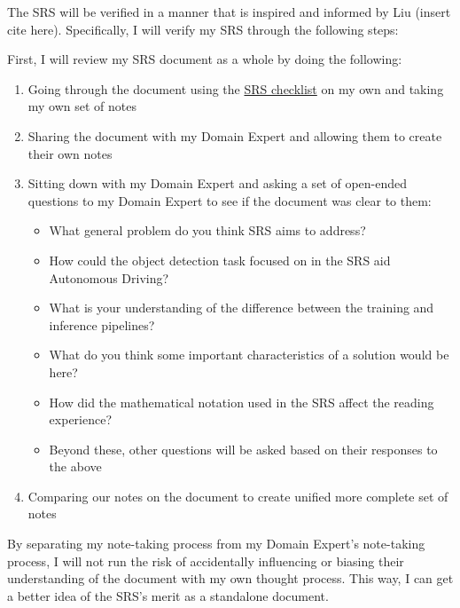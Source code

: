 \documentclass[12pt, titlepage]{article}
\begin{document}
The SRS will be verified in a manner that is inspired and informed by Liu (insert cite here).
Specifically, I will verify my SRS through the following steps:

First, I will review my SRS document as a whole by doing the following:
\begin{enumerate}
  \item Going through the document using the \href{https://github.com/alaapgrandhi/equivariant-sensor-fusion/blob/main/docs/Checklists/SRS-Checklist.pdf}{SRS checklist} on my own and taking my own set of notes
  \item Sharing the document with my Domain Expert and allowing them to create their own notes
  \item Sitting down with my Domain Expert and asking a set of open-ended questions to my Domain Expert to see if the document was clear to them:
  \begin{itemize}
    \item What general problem do you think SRS aims to address?
    \item How could the object detection task focused on in the SRS aid Autonomous Driving?
    \item What is your understanding of the difference between the training and inference pipelines?
    \item What do you think some important characteristics of a solution would be here?
    \item How did the mathematical notation used in the SRS affect the reading experience?
    \item Beyond these, other questions will be asked based on their responses to the above
  \end{itemize}
  \item Comparing our notes on the document to create unified more complete set of notes
\end{enumerate}
By separating my note-taking process from my Domain Expert's note-taking process, I will not 
run the risk of accidentally influencing or biasing their understanding of the document with my 
own thought process. This way, I can get a better idea of the SRS's merit as a standalone document.
\end{document}
